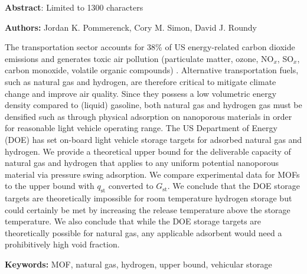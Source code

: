 \documentclass[letterpaper,onecolumn,amsmath,amssymb,jcp,aps,12pt]{revtex4-1}
\begin{document}
\begin{center}
    \textbf{Abstract}: Limited to 1300 characters
\end{center}

\center{}
\textbf{Authors:} Jordan K. Pommerenck, Cory M. Simon, David J. Roundy

\justify{}
The transportation sector accounts for 38\% of US energy-related carbon dioxide emissions \cite{useia} and generates toxic air pollution (particulate matter, ozone, NO$_x$, SO$_x$, carbon monoxide, volatile organic compounds) \cite{caiazzo2013air}. Alternative transportation fuels, such as natural gas and hydrogen, are therefore critical to mitigate climate change \cite{mcglade2015geographical} and improve air quality.
%
Since they possess a low volumetric energy density compared to (liquid) gasoline, both natural gas and hydrogen gas must be densified such as through physical adsorption on nanoporous materials \cite{schoedel2016role} in order for reasonable light vehicle operating range.  
%
The US Department of Energy (DOE) has set on-board light vehicle storage targets for adsorbed natural gas and hydrogen. We provide a theoretical upper bound for the deliverable capacity of natural gas and hydrogen that applies to any uniform potential nanoporous material via pressure swing adsorption. We compare experimental data for MOFs to the upper bound with $q_\text{st}$ converted to $G_\text{st}$. We conclude that the DOE storage targets are theoretically impossible for room temperature hydrogen storage but could certainly be met by increasing the release temperature above the storage temperature. We also conclude that while the DOE storage targets are theoretically possible for natural gas, any applicable adsorbent would need a prohibitively high void fraction.

\justify{}
\textbf{Keywords:} MOF, natural gas, hydrogen, upper bound, vehicular storage


\end{document}
